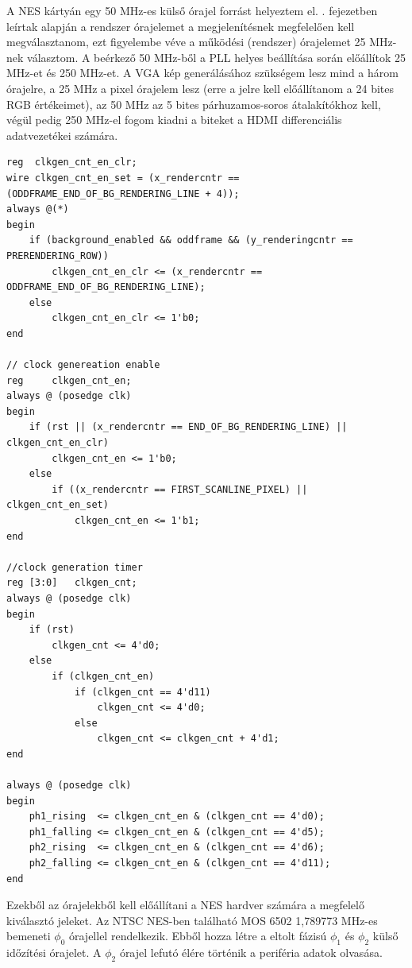 A NES kártyán egy 50 MHz-es külső órajel forrást helyeztem el. . fejezetben leírtak alapján a rendszer órajelemet a megjelenítésnek megfelelően kell megválasztanom, ezt figyelembe véve a működési (rendszer) órajelemet 25 MHz-nek választom. A beérkező 50 MHz-ből a PLL helyes beállítása során előállítok 25 MHz-et és 250 MHz-et. A VGA kép generálásához szükségem lesz mind a három órajelre, a 25 MHz a pixel órajelem lesz (erre a jelre kell előállítanom a  24 bites RGB értékeimet), az 50 MHz az 5 bites párhuzamos-soros átalakítókhoz kell, végül pedig 250 MHz-el fogom kiadni a biteket a HDMI differenciális adatvezetékei számára. 

\begin{lstlisting}[caption={6502 $\phi_1$ és $\phi_2$ vezérlőjelek előállítása}, label={code:6502-clocksignals}, style=prettyverilog]
reg  clkgen_cnt_en_clr;
wire clkgen_cnt_en_set = (x_rendercntr == (ODDFRAME_END_OF_BG_RENDERING_LINE + 4));
always @(*) 
begin
	if (background_enabled && oddframe && (y_renderingcntr == PRERENDERING_ROW))
		clkgen_cnt_en_clr <= (x_rendercntr == ODDFRAME_END_OF_BG_RENDERING_LINE);
	else
		clkgen_cnt_en_clr <= 1'b0;	
end

// clock genereation enable
reg		clkgen_cnt_en;
always @ (posedge clk)
begin
	if (rst || (x_rendercntr == END_OF_BG_RENDERING_LINE) || clkgen_cnt_en_clr)
		clkgen_cnt_en <= 1'b0;
	else
		if ((x_rendercntr == FIRST_SCANLINE_PIXEL) || clkgen_cnt_en_set)
			clkgen_cnt_en <= 1'b1;
end	

//clock generation timer
reg	[3:0]	clkgen_cnt;
always @ (posedge clk)
begin
	if (rst)
		clkgen_cnt <= 4'd0;
	else
		if (clkgen_cnt_en)
			if (clkgen_cnt == 4'd11)
				clkgen_cnt <= 4'd0;
			else
				clkgen_cnt <= clkgen_cnt + 4'd1;
end

always @ (posedge clk)
begin
	ph1_rising	<= clkgen_cnt_en & (clkgen_cnt == 4'd0);
	ph1_falling <= clkgen_cnt_en & (clkgen_cnt == 4'd5);
	ph2_rising	<= clkgen_cnt_en & (clkgen_cnt == 4'd6);
	ph2_falling <= clkgen_cnt_en & (clkgen_cnt == 4'd11);
end\end{lstlisting}

Ezekből az órajelekből kell előállítani a NES hardver számára a megfelelő kiválasztó jeleket. Az NTSC NES-ben található MOS 6502 1,789773 MHz-es bemeneti $\phi_0$ órajellel rendelkezik. Ebből hozza létre a eltolt fázisú $\phi_1$ és $\phi_2$ külső időzítési órajelet. %
A $\phi_2$ órajel lefutó élére történik a periféria adatok olvasása. 

